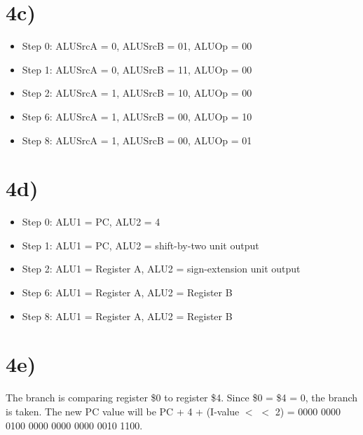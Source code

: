 \documentclass[a4paper,11pt]{article}
\begin{document}
\section*{4c)}
\begin{itemize}
  \item Step 0: ALUSrcA = 0, ALUSrcB = 01, ALUOp = 00
  \item Step 1: ALUSrcA = 0, ALUSrcB = 11, ALUOp = 00
  \item Step 2: ALUSrcA = 1, ALUSrcB = 10, ALUOp = 00
  \item Step 6: ALUSrcA = 1, ALUSrcB = 00, ALUOp = 10
  \item Step 8: ALUSrcA = 1, ALUSrcB = 00, ALUOp = 01
\end{itemize}

\section*{4d)}
\begin{itemize}
  \item Step 0: ALU1 = PC, ALU2 = 4
  \item Step 1: ALU1 = PC, ALU2 = shift-by-two unit output
  \item Step 2: ALU1 = Register A, ALU2 = sign-extension unit output
  \item Step 6: ALU1 = Register A, ALU2 = Register B
  \item Step 8: ALU1 = Register A, ALU2 = Register B
\end{itemize}

\section*{4e)}
The branch is comparing register \$0 to register \$4.  Since \$0 = \$4 = 0, the branch is taken.  The new PC value will be
PC + 4 + (I-value $<$ $<$ 2) = 0000 0000 0100 0000 0000 0000 0010 1100.


\end{document}
